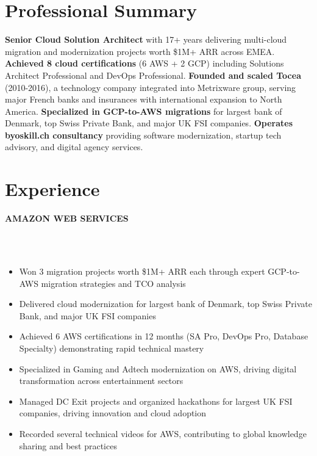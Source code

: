 \documentclass[10pt]{article}
\newcommand{\sectionsep}{\vspace{1.5pt}}
\newcommand{\runsubsection}[1]{
  \vspace{0.5pt}
  \color{subheadings}\fontsize{10pt}{11.5pt}\selectfont\bfseries\uppercase{#1}\normalfont
}
\newcommand{\descript}[1]{
  \color{subheadings}\fontsize{8pt}{9.5pt}\selectfont{#1}\normalfont\\[0.25pt]
}
\newcommand{\location}[1]{
  \color{headings}\fontsize{7pt}{8.5pt}\selectfont{#1}\normalfont\\[0.25pt]
}
\newenvironment{tightemize}{
\vspace{0pt}
\begin{itemize}[
  label=\textbullet,
  leftmargin=9pt,
  itemsep=0.25pt,
  parsep=0pt,
  topsep=0.25pt,
  partopsep=0pt
]
}{\end{itemize}\vspace{0.25pt}}
\begin{document}
\begin{paracol}{2}

\switchcolumn[0]


\section{Professional Summary}
\textbf{Senior Cloud Solution Architect} with 17+ years delivering multi-cloud migration and modernization projects worth \$1M+ ARR across EMEA. \textbf{Achieved 8 cloud certifications} (6 AWS + 2 GCP) including Solutions Architect Professional and DevOps Professional. \textbf{Founded and scaled Tocea} (2010-2016), a technology company integrated into Metrixware group, serving major French banks and insurances with international expansion to North America. \textbf{Specialized in GCP-to-AWS migrations} for largest bank of Denmark, top Swiss Private Bank, and major UK FSI companies. \textbf{Operates byoskill.ch consultancy} providing software modernization, startup tech advisory, and digital agency services.
\sectionsep


\section{Experience}

\runsubsection{Amazon Web Services}
\descript{| Specialist Solution Architect}
\location{Jan 2023 – Present | Lausanne, Switzerland}
\begin{tightemize}
\item Won 3 migration projects worth \$1M+ ARR each through expert GCP-to-AWS migration strategies and TCO analysis
\item Delivered cloud modernization for largest bank of Denmark, top Swiss Private Bank, and major UK FSI companies
\item Achieved 6 AWS certifications in 12 months (SA Pro, DevOps Pro, Database Specialty) demonstrating rapid technical mastery
\item Specialized in Gaming and Adtech modernization on AWS, driving digital transformation across entertainment sectors
\item Managed DC Exit projects and organized hackathons for largest UK FSI companies, driving innovation and cloud adoption
\item Recorded several technical videos for AWS, contributing to global knowledge sharing and best practices
\end{tightemize}
\sectionsep


\end{paracol}
\end{document}
